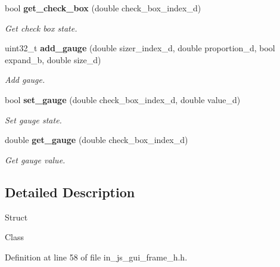 \begin{DoxyCompactItemize}
bool \textbf{ get\+\_\+check\+\_\+box} (double check\+\_\+box\+\_\+index\+\_\+d)
\begin{DoxyCompactList}\small\item\em Get check box state. \end{DoxyCompactList}\item 
uint32\+\_\+t \textbf{ add\+\_\+gauge} (double sizer\+\_\+index\+\_\+d, double proportion\+\_\+d, bool expand\+\_\+b, double size\+\_\+d)
\begin{DoxyCompactList}\small\item\em Add gauge. \end{DoxyCompactList}\item 
bool \textbf{ set\+\_\+gauge} (double check\+\_\+box\+\_\+index\+\_\+d, double value\+\_\+d)
\begin{DoxyCompactList}\small\item\em Set gauge state. \end{DoxyCompactList}\item 
double \textbf{ get\+\_\+gauge} (double check\+\_\+box\+\_\+index\+\_\+d)
\begin{DoxyCompactList}\small\item\em Get gauge value. \end{DoxyCompactList}\end{DoxyCompactItemize}


\subsection{Detailed Description}
Struct

Class 

Definition at line 58 of file in\+\_\+js\+\_\+gui\+\_\+frame\+\_\+h.\+h.



